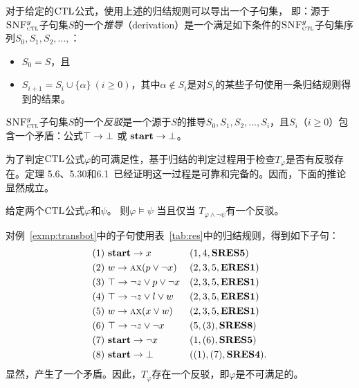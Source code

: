 对于给定的$\textrm{CTL}$公式，使用上述的归结规则可以导出一个子句集，
即：源于${\textsc{SNF}_{\textsc{ctl}}^g}$子句集$S$的一个\emph{推导}（derivation）是一个满足如下条件的${\textsc{SNF}_{\textsc{ctl}}^g}$子句集序列$S_0, S_1, S_2, \ldots, $：
\begin{itemize}
	\item $S_0=S$，且
	\item $S_{i+1} = S_i\cup \{\alpha\}~(i\ge 0)$，其中$\alpha\notin S_i$是对$S_i$的某些子句使用一条归结规则得到的结果。
\end{itemize}

${\textsc{SNF}_{\textsc{ctl}}^g}$子句集$S$的一个\emph{反驳}是一个源于$S$的推导$S_0, S_1, S_2, \ldots, S_i$，且$S_i$（$i\geq 0$）包含一个矛盾：公式$\top\rightarrow\bot$ 或 $\textbf{start}\rightarrow\bot$。

为了判定$\textrm{CTL}$公式$\varphi$的可满足性，基于归结的判定过程用于检查$T_{\varphi}$是否有反驳存在。定理 5.6、5.30和6.1~\cite{zhang2014resolution}已经证明这一过程是可靠和完备的。因而，下面的推论显然成立。
\begin{corollary}
	给定两个$\textrm{CTL}$公式$\varphi$和$\psi$。 则$\varphi\models\psi$ 当且仅当 $T_{\varphi\land\neg\psi}$有一个反驳。
\end{corollary}

\begin{example}\label{exmp:resbot}
	对例~\ref{exmp:transbot}中的子句使用表~\ref{tab:res}中的归结规则，得到如下子句：
	\begin{align*}
		&(1)\ \textbf{start} \rightarrow x  && (1, 4, \textbf{SRES5})\\
		&(2)\ w \rightarrow \textsc{a}\textsc{x} (p \vee \neg x) && (2, 3,5,\textbf{ERES1})\\
		&(3)\ \top \rightarrow  \neg z \vee p \vee \neg x  && (2, 3,5,\textbf{ERES1})\\
		&(4)\ \top \rightarrow \neg z \vee l \vee w && (2, 3,5,\textbf{ERES1})\\
		&(5)\ w \rightarrow \textsc{a} \textsc{x}(x \vee w) && (2, 3,5,\textbf{ERES1})\\
		&(6)\ \top \rightarrow \neg z \vee \neg x && (5, (3), \textbf{SRES8})\\
		&(7)\ \textbf{start} \rightarrow \neg x && (1, (6), \textbf{SRES5}) \\
		&(8)\ \textbf{start} \rightarrow \bot && ((1), (7), \textbf{SRES4}).
	\end{align*}
	显然，产生了一个矛盾。因此，$T_{\varphi}$存在一个反驳，即$\varphi$是不可满足的。
\end{example}


